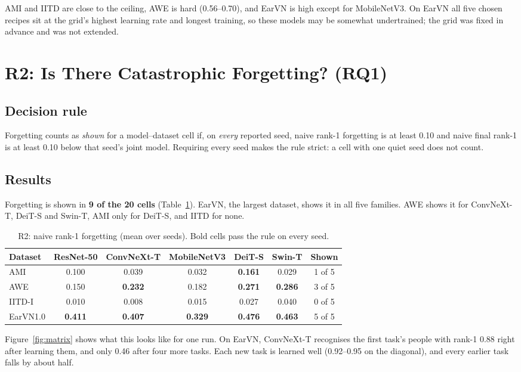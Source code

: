 \documentclass[12pt,a4paper]{report}
\begin{document}
AMI and IITD are close to the ceiling, AWE is hard (0.56--0.70), and EarVN is high except for MobileNetV3. On EarVN all five chosen recipes sit at the grid's highest learning rate and longest training, so these models may be somewhat undertrained; the grid was fixed in advance and was not extended.

\section{R2: Is There Catastrophic Forgetting? (RQ1)}
\subsection{Decision rule}
Forgetting counts as \emph{shown} for a model--dataset cell if, on \emph{every} reported seed, naive rank-1 forgetting is at least 0.10 and naive final rank-1 is at least 0.10 below that seed's joint model. Requiring every seed makes the rule strict: a cell with one quiet seed does not count.

\subsection{Results}
Forgetting is shown in \textbf{9 of the 20 cells} (Table~\ref{tab:r2}). EarVN, the largest dataset, shows it in all five families. AWE shows it for ConvNeXt-T, DeiT-S and Swin-T, AMI only for DeiT-S, and IITD for none.

\begin{table}[H]
\centering
\small
\caption{R2: naive rank-1 forgetting (mean over seeds). Bold cells pass the rule on every seed.}
\label{tab:r2}
\begin{tabular}{|l|c|c|c|c|c|c|}
\hline
\textbf{Dataset} & \textbf{ResNet-50} & \textbf{ConvNeXt-T} & \textbf{MobileNetV3} & \textbf{DeiT-S} & \textbf{Swin-T} & \textbf{Shown} \\
\hline
AMI & 0.100 & 0.039 & 0.032 & \textbf{0.161} & 0.029 & 1 of 5 \\
AWE & 0.150 & \textbf{0.232} & 0.182 & \textbf{0.271} & \textbf{0.286} & 3 of 5 \\
IITD-I & 0.010 & 0.008 & 0.015 & 0.027 & 0.040 & 0 of 5 \\
EarVN1.0 & \textbf{0.411} & \textbf{0.407} & \textbf{0.329} & \textbf{0.476} & \textbf{0.463} & 5 of 5 \\
\hline
\end{tabular}
\end{table}

Figure~\ref{fig:matrix} shows what this looks like for one run. On EarVN, ConvNeXt-T recognises the first task's people with rank-1 0.88 right after learning them, and only 0.46 after four more tasks. Each new task is learned well (0.92--0.95 on the diagonal), and every earlier task falls by about half.
\end{document}
